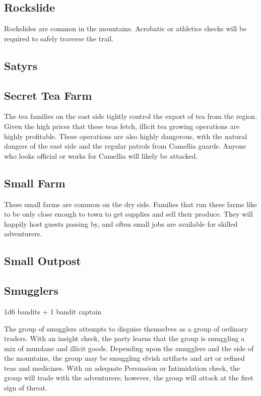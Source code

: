 \subsection{Rockslide}

Rockslides are common in the mountains.
Acrobatic or athletics checks will be required to safely traverse the trail.

\subsection{Satyrs}

\subsection{Secret Tea Farm}

The tea families on the east side tightly control the export of tea from the region.
Given the high prices that these teas fetch, illicit tea growing operations are highly profitable.
These operations are also highly dangerous, with the natural dangers of the east side and the regular patrols from Camellia guards.
Anyone who looks official or works for Camellia will likely be attacked.

\subsection{Small Farm}

These small farms are common on the dry side.
Families that run these farms like to be only close enough to town to get supplies and sell their produce.
They will happily host guests passing by, and often small jobs are available for skilled adventurers.

\subsection{Small Outpost}

\subsection{Smugglers}

1d6 bandits + 1 bandit captain

The group of smugglers attempts to disguise themselves as a group of ordinary traders.
With an insight check, the party learns that the group is smuggling a mix of mundane and illicit goods.
Depending upon the smugglers and the side of the mountains, the group may be smuggling elvish artifacts and art or refined teas and medicines.
With an adequate Persuasion or Intimidation check, the group will trade with the adventurers; however, the group will attack at the first sign of threat.

